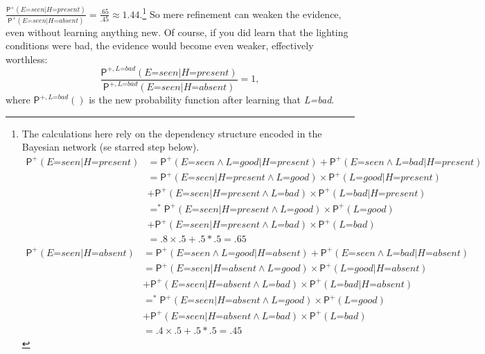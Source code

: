 \documentclass[
  11pt,
  dvipsnames,enabledeprecatedfontcommands]{scrartcl}
\newcommand{\ppr}[2]{\ensuremath{\mathsf{P}^{#1}(#2)}}
\begin{document}
\(\frac{\ppr{+}{\textit{E=seen} \vert \textit{H=present}}}{\ppr{+}{\textit{E=seen} \vert \textit{H=absent}}}=\frac{.65}{.45}\approx 1.44\).\footnote{The
  calculations here rely on the dependency structure encoded in the
  Bayesian network (se starred step below). \begin{align*}
  \ppr{+}{\textit{E=seen} \vert \textit{H=present}} &= \ppr{+}{\textit{E=seen} \wedge \textit{L=good} \vert \textit{H=present}}+\ppr{+}{\textit{E=seen} \wedge \textit{L=bad} \vert \textit{H=present}}\\
  &= \ppr{+}{\textit{E=seen} \vert \textit{H=present} \wedge \textit{L=good}}  \times \ppr{+}{\textit{L=good} \vert  \textit{H=present} }\\ & +\ppr{+}{\textit{E=seen}  \vert \textit{H=present} \wedge \textit{L=bad}} \times \ppr{+}{\textit{L=bad} \vert  \textit{H=present}}\\
  &=^* \ppr{+}{\textit{E=seen} \vert \textit{H=present} \wedge \textit{L=good}}  \times \ppr{+}{\textit{L=good}}\\ & +\ppr{+}{\textit{E=seen}  \vert \textit{H=present} \wedge \textit{L=bad}} \times \ppr{+}{\textit{L=bad}}\\
  &= .8 \times .5 +.5 *.5 = .65 
  \end{align*} \begin{align*}
  \ppr{+}{\textit{E=seen} \vert \textit{H=absent}} &= \ppr{+}{\textit{E=seen} \wedge \textit{L=good} \vert \textit{H=absent}}+\ppr{+}{\textit{E=seen} \wedge \textit{L=bad} \vert \textit{H=absent}}\\
  &= \ppr{+}{\textit{E=seen} \vert \textit{H=absent} \wedge \textit{L=good}}  \times \ppr{+}{\textit{L=good} \vert  \textit{H=absent} }\\ & +\ppr{+}{\textit{E=seen}  \vert \textit{H=absent} \wedge \textit{L=bad}} \times \ppr{+}{\textit{L=bad} \vert  \textit{H=absent}}\\
  &=^* \ppr{+}{\textit{E=seen} \vert \textit{H=absent} \wedge \textit{L=good}}  \times \ppr{+}{\textit{L=good}}\\ & +\ppr{+}{\textit{E=seen}  \vert \textit{H=absent} \wedge \textit{L=bad}} \times \ppr{+}{\textit{L=bad}}\\
  &= .4 \times .5 +.5 *.5 = .45 
  \end{align*}} So
mere refinement can weaken the evidence, even without learning anything
new. Of course, if you did learn that the lighting conditions were bad,
the evidence would become even weaker, effectively worthless:
\[\frac{\ppr{+, \textit{L=bad}}{\textit{E=seen} \vert \textit{H=present}}}{\ppr{+, \textit{L=bad}}{\textit{E=seen} \vert \textit{H=absent}}}=1,\]
where \(\ppr{+, \textit{L=bad}}{}\) is the new probability function
after learning that \textit{L=bad}.
\end{document}
